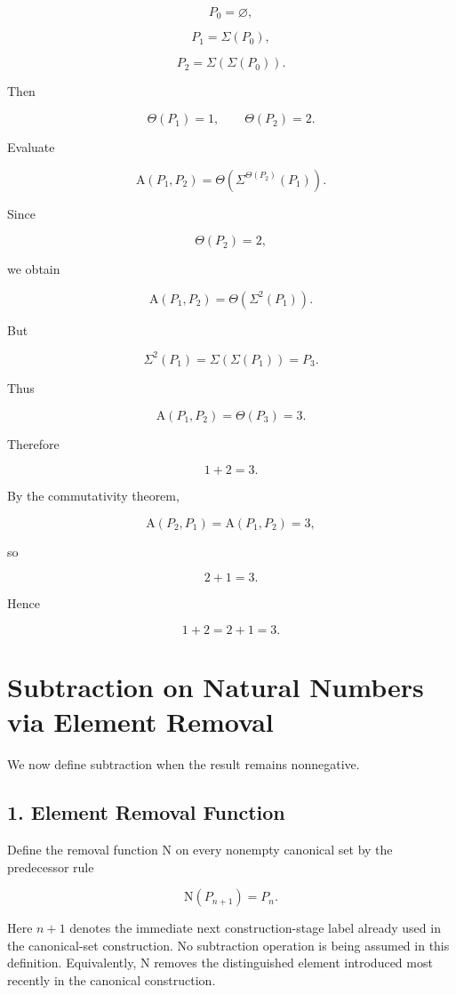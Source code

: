 \documentclass[12pt]{article}
\newcommand{\Alpha}{\mathrm{A}}
\newcommand{\Nu}{\mathrm{N}}
\begin{document}
\[
P_0=\varnothing,
\]

\[
P_1=\Sigma(P_0),
\]

\[
P_2=\Sigma(\Sigma(P_0)).
\]

Then

\[
\Theta(P_1)=1,
\qquad
\Theta(P_2)=2.
\]

Evaluate

\[
\Alpha(P_1,P_2)
=
\Theta\left(\Sigma^{\Theta(P_2)}(P_1)\right).
\]

Since

\[
\Theta(P_2)=2,
\]

we obtain

\[
\Alpha(P_1,P_2)
=
\Theta(\Sigma^2(P_1)).
\]

But

\[
\Sigma^2(P_1)
=
\Sigma(\Sigma(P_1))
=
P_3.
\]

Thus

\[
\Alpha(P_1,P_2)
=
\Theta(P_3)
=
3.
\]

Therefore

\[
1+2=3.
\]

By the commutativity theorem,

\[
\Alpha(P_2,P_1)=\Alpha(P_1,P_2)=3,
\]

so

\[
2+1=3.
\]

Hence

\[
\boxed{
1+2=2+1=3.
}
\]

\section*{Subtraction on Natural Numbers via Element Removal}

We now define subtraction when the result remains nonnegative.

\subsection*{1. Element Removal Function}

Define the removal function \(\Nu\) on every nonempty canonical set by the predecessor rule

\[
\boxed{
\Nu(P_{n+1})=P_n.
}
\]

Here \(n+1\) denotes the immediate next construction-stage label already used in the canonical-set construction. No subtraction operation is being assumed in this definition. Equivalently, \(\Nu\) removes the distinguished element introduced most recently in the canonical construction.
\end{document}
